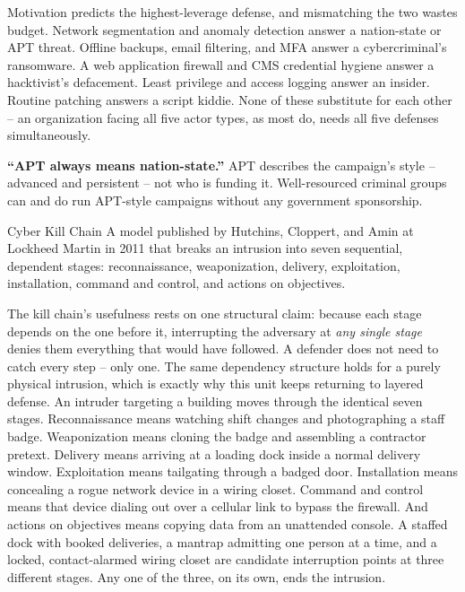 Motivation predicts the highest-leverage defense, and mismatching the two wastes budget. Network
segmentation and anomaly detection answer a nation-state or APT threat. Offline backups, email
filtering, and MFA answer a cybercriminal's ransomware. A web application firewall and CMS
credential hygiene answer a hacktivist's defacement. Least privilege and access logging answer an
insider. Routine patching answers a script kiddie. None of these substitute for each other --
an organization facing all five actor types, as most do, needs all five defenses simultaneously.

\begin{misconception}
\textbf{``APT always means nation-state.''} APT describes the campaign's style -- advanced and
persistent -- not who is funding it. Well-resourced criminal groups can and do run APT-style
campaigns without any government sponsorship.
\end{misconception}

\begin{definition}{Cyber Kill Chain}
A model published by Hutchins, Cloppert, and Amin at Lockheed Martin in 2011 that
breaks an intrusion into seven sequential, dependent stages: reconnaissance, weaponization,
delivery, exploitation, installation, command and control, and actions on objectives.
\end{definition}

The kill chain's usefulness rests on one structural claim: because each stage depends on the one
before it, interrupting the adversary at \emph{any single stage} denies them everything that would
have followed. A defender does not need to catch every step -- only one. The same dependency
structure holds for a purely physical intrusion, which is exactly why this unit keeps returning to
layered defense. An intruder targeting a building moves through the identical seven stages.
Reconnaissance means watching shift changes and photographing a staff badge. Weaponization means
cloning the badge and assembling a contractor pretext. Delivery means arriving at a loading dock
inside a normal delivery window. Exploitation means tailgating through a badged door. Installation
means concealing a rogue network device in a wiring closet. Command and control means that device
dialing out over a cellular link to bypass the firewall. And actions on objectives means copying
data from an unattended console. A staffed dock with booked deliveries, a mantrap admitting one
person at a time, and a locked, contact-alarmed wiring closet are candidate interruption points at
three different stages. Any one of the three, on its own, ends the intrusion.

